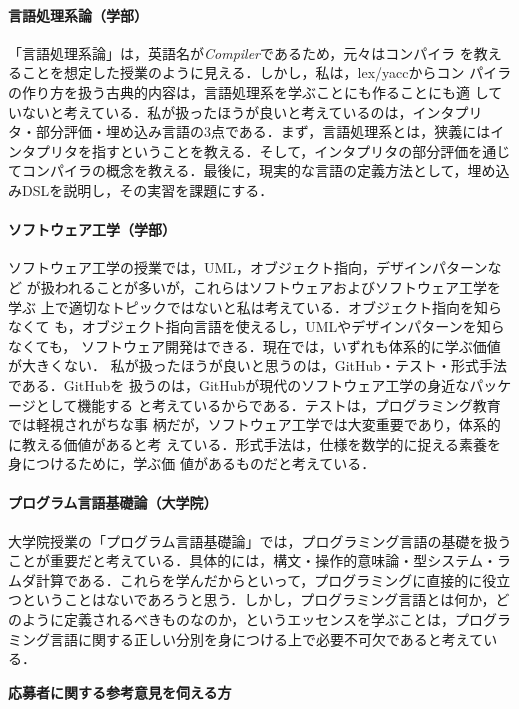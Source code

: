 \documentclass[dvipdfmx]{jsarticle}
\begin{document}
\paragraph{言語処理系論（学部）}
「言語処理系論」は，英語名が\emph{Compiler}であるため，元々はコンパイラ
を教えることを想定した授業のように見える．しかし，私は，lex/yaccからコン
パイラの作り方を扱う古典的内容は，言語処理系を学ぶことにも作ることにも適
していないと考えている．私が扱ったほうが良いと考えているのは，インタプリ
タ・部分評価・埋め込み言語の3点である．まず，言語処理系とは，狭義にはイ
ンタプリタを指すということを教える．そして，インタプリタの部分評価を通じ
てコンパイラの概念を教える．最後に，現実的な言語の定義方法として，埋め込
みDSLを説明し，その実習を課題にする．

\paragraph{ソフトウェア工学（学部）}
ソフトウェア工学の授業では，UML，オブジェクト指向，デザインパターンなど
が扱われることが多いが，これらはソフトウェアおよびソフトウェア工学を学ぶ
上で適切なトピックではないと私は考えている．オブジェクト指向を知らなくて
も，オブジェクト指向言語を使えるし，UMLやデザインパターンを知らなくても，
ソフトウェア開発はできる．現在では，いずれも体系的に学ぶ価値が大きくない．
私が扱ったほうが良いと思うのは，GitHub・テスト・形式手法である．GitHubを
扱うのは，GitHubが現代のソフトウェア工学の身近なパッケージとして機能する
と考えているからである．テストは，プログラミング教育では軽視されがちな事
柄だが，ソフトウェア工学では大変重要であり，体系的に教える価値があると考
えている．形式手法は，仕様を数学的に捉える素養を身につけるために，学ぶ価
値があるものだと考えている．

\paragraph{プログラム言語基礎論（大学院）}
大学院授業の「プログラム言語基礎論」では，プログラミング言語の基礎を扱う
ことが重要だと考えている．具体的には，構文・操作的意味論・型システム・ラ
ムダ計算である．これらを学んだからといって，プログラミングに直接的に役立
つということはないであろうと思う．しかし，プログラミング言語とは何か，ど
のように定義されるべきものなのか，というエッセンスを学ぶことは，プログラ
ミング言語に関する正しい分別を身につける上で必要不可欠であると考えている．

\newpage
\begin{center}
\LARGE\bfseries 応募者に関する参考意見を伺える方
\end{center}
\bigskip
\end{document}
